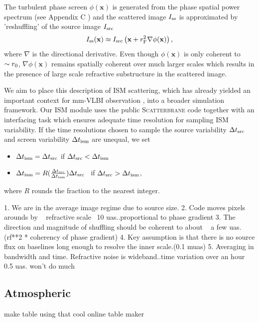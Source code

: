 The turbulent phase screen $\phi(\mathbf{x})$ is generated from the phase spatial power spectrum (see Appendix C \citet*{Johnson_2015a}) and the scattered image $I_{\rm ss}$ is approximated by 'reshuffling' of the source image $I_{\rm src}$
\begin{equation}
I_{\rm ss}(\mathbf{x}) \approx I_{\rm src}\left(\mathbf{x} + r_{\rm F}^2 \nabla \phi(\mathbf{x})\right),
\end{equation}
where $\nabla$ is the directional derivative. Even though $\phi(\mathbf{x})$ is only coherent to $\sim r_{\rm 0}$, $\nabla \phi(\mathbf{x})$ remains spatially coherent over much larger scales which results in the presence of large scale refractive substructure in the scattered image. 


We aim to place this description of ISM scattering, which has already yielded an important context for mm-VLBI observation \citep[e.g.][]{2016arXiv160106571O}, into a broader simulation framework. Our ISM module uses the public \textsc{Scatterbrane} code together with an interfacing task which ensures adequate time resolution for sampling ISM variability. If the time resolutions chosen to sample the source variability $\Delta t_{\rm src}$ and screen variability $\Delta t_{\rm ism}$ are unequal, we set  
\begin{itemize}
 \setlength\itemsep{1em}
\item $\Delta t_{\rm ism}=\Delta t_{\rm src}$ \qquad \qquad if \qquad  $\Delta t_{\rm src} < \Delta t_{\rm ism}$
\item $\Delta t_{\rm ism}=R(\frac{\Delta t_{\rm src}}{\Delta t_{\rm ism}})\Delta t_{\rm src}$ \ if \qquad  $\Delta t_{\rm src} > \Delta t_{\rm ism}$,
\end{itemize}
where $R$ rounds the fraction to the nearest integer. 

1. We are in the average image regime due to source size.
2. Code moves pixels arounds by ~ refractive scale ~10 uas..proportional to phase gradient 
3. The direction and magnitude of shuffling should be coherent to about ~ a few uas. (rf**2 * coherency of phase gradient)
4. Key assumption is that there is no source flux on baselines long enough to resolve the inner scale.(0.1 muas)
5. Averaging in bandwidth and time. Refractive noise is wideband..time variation over an hour ~ 0.5 uas. won't do much

\subsection{Atmospheric}
make table using that cool online table maker\\



